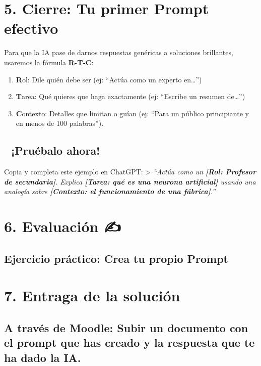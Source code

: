 \documentclass[
  spanish,
  letterpaper,
  DIV=11,
  numbers=noendperiod,
  oneside]{scrreprt}
\providecommand{\tightlist}{%
  \setlength{\itemsep}{0pt}\setlength{\parskip}{0pt}}
\begin{document}
\section{5. Cierre: Tu primer Prompt
efectivo}\label{cierre-tu-primer-prompt-efectivo}

Para que la IA pase de darnos respuestas genéricas a soluciones
brillantes, usaremos la fórmula \textbf{R-T-C}:

\begin{enumerate}
\def\labelenumi{\arabic{enumi}.}
\tightlist
\item
  \textbf{R}ol: Dile quién debe ser (ej: ``Actúa como un experto
  en\ldots{}'')
\item
  \textbf{T}area: Qué quieres que haga exactamente (ej: ``Escribe un
  resumen de\ldots{}'')
\item
  \textbf{C}ontexto: Detalles que limitan o guían (ej: ``Para un público
  principiante y en menos de 100 palabras'').
\end{enumerate}

\subsection{🚀 ¡Pruébalo ahora!}\label{pruuxe9balo-ahora}

Copia y completa este ejemplo en ChatGPT: \textgreater{} \emph{``Actúa
como un \textbf{{[}Rol: Profesor de secundaria{]}}. Explica
\textbf{{[}Tarea: qué es una neurona artificial{]}} usando una analogía
sobre \textbf{{[}Contexto: el funcionamiento de una fábrica{]}}.''}

\section{6. Evaluación ✍️}\label{evaluaciuxf3n}

\subsection{Ejercicio práctico: Crea tu propio
Prompt}\label{ejercicio-pruxe1ctico-crea-tu-propio-prompt}

\section{7. Entraga de la solución}\label{entraga-de-la-soluciuxf3n}

\subsection{A través de Moodle: Subir un documento con el prompt que has
creado y la respuesta que te ha dado la
IA.}\label{a-travuxe9s-de-moodle-subir-un-documento-con-el-prompt-que-has-creado-y-la-respuesta-que-te-ha-dado-la-ia.}
\end{document}
